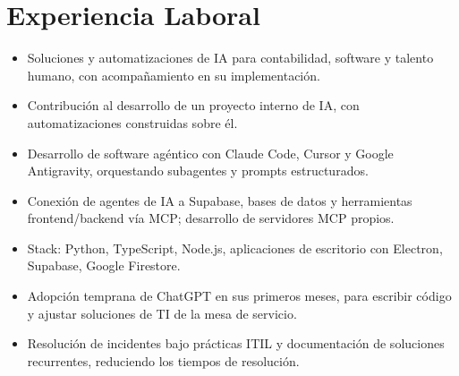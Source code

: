 \section{Experiencia Laboral}
\begin{itemize}
  \item Soluciones y automatizaciones de IA para contabilidad, software y talento humano, con acompañamiento en su implementación.
  \item Contribución al desarrollo de un proyecto interno de IA, con automatizaciones construidas sobre él.
  \item Desarrollo de software agéntico con Claude Code, Cursor y Google Antigravity, orquestando subagentes y prompts estructurados.
  \item Conexión de agentes de IA a Supabase, bases de datos y herramientas frontend/backend vía MCP; desarrollo de servidores MCP propios.
  \item Stack: Python, TypeScript, Node.js, aplicaciones de escritorio con Electron, Supabase, Google Firestore.
\end{itemize}

\begin{itemize}
  \item Adopción temprana de ChatGPT en sus primeros meses, para escribir código y ajustar soluciones de TI de la mesa de servicio.
  \item Resolución de incidentes bajo prácticas ITIL y documentación de soluciones recurrentes, reduciendo los tiempos de resolución.
\end{itemize}

